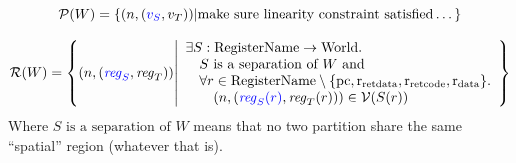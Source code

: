 \documentclass[a3paper]{article}
\newcommand{\npair}[2][n]{\left(#1,#2\right)}
\newcommand{\fun}{\rightarrow}
\newcommand{\tand}{\text{ and }}
\newcommand{\typesetlr}[1]{\mathcal{#1}}
\newcommand{\lrr}{\typesetlr{R}}
\newcommand{\lrv}{\typesetlr{V}}
\newcommand{\lrp}{\typesetlr{P}}
\newcommand{\stpair}[3][]{
\ifthenelse{\equal{#1}{}}
{\left(\src{#2_S},#3_T\right)}
{\left(\src{#2},#3\right)}}
\newcommand{\World}{\mathrm{World}}
\newcommand{\sourcecolor}{\color{blue}}
\newcommand{\src}[1]{{\sourcecolor #1}}
\newcommand{\shareddom}[1]{\mathrm{#1}}
\newcommand{\RegName}{\shareddom{RegisterName}}
\newcommand{\var}[1]{\mathit{#1}}
\newcommand{\reg}{\var{reg}}
\newcommand{\pcreg}{\mathrm{pc}}
\newcommand{\rretc}{\mathrm{r}_\mathrm{ret code}}
\newcommand{\rretd}{\mathrm{r}_\mathrm{ret data}}
\newcommand{\rdata}{\mathrm{r}_\mathrm{data}}
\begin{document}
\[
  \lrp(W) = \left\{
    \npair{\stpair{v}{v}} \middle| \text{make sure linearity constraint satisfied}\dots 
  \right\}
\]


\[
  \lrr(W) = \left\{ \npair{\stpair{\reg}{\reg}} \middle|
    \begin{array}{l}
      \exists S : \RegName \fun \World \ldotp \\
      \quad S \text{ is a separation of $W$} \tand\\
      \quad \forall r \in \RegName \setminus \{\pcreg, \rretd,\rretc,\rdata \}\ldotp\\
      \qquad\npair{\stpair[.]{\src{\reg_S(r)}}{\reg_T(r)}} \in \lrv(S(r))
    \end{array}
            \right\}
\]
Where $S\text{ is a separation of $W$}$ means that no two partition share the same ``spatial'' region (whatever that is).
\end{document}
